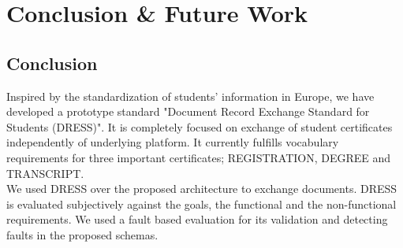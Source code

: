 \documentclass[12pt,a4paper,oneside]{book}
\begin{document}
	






\chapter{Conclusion \& Future Work}\label{ch:Conclusions}


	\section{Conclusion}\label{sec:conclusion}

	Inspired by the standardization of students' information in Europe, we have developed a prototype standard "Document Record Exchange Standard for Students (DRESS)". It is completely focused on exchange of student certificates independently of underlying platform. It currently fulfills vocabulary requirements for three important certificates; REGISTRATION, DEGREE and TRANSCRIPT. \\
	
	We used DRESS over the proposed architecture to exchange documents. DRESS is evaluated subjectively  against the goals, the functional and the non-functional requirements. We used a fault based evaluation for its validation and detecting faults in the proposed schemas. \\
	
\end{document}
